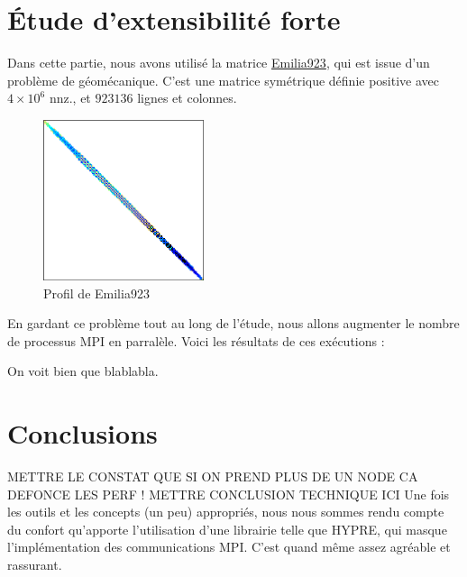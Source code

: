 \documentclass[10pt,twocolumn,letterpaper]{article}
\begin{document}
\section{Étude d'extensibilité forte}

Dans cette partie, nous avons utilisé la matrice
\href{https://sparse.tamu.edu/Janna/Emilia_923}{Emilia923}, qui est issue d'un
problème de géomécanique. C'est une matrice symétrique définie positive avec 
$4\times 10^6$ nnz., et $923136$ lignes et colonnes.

\begin{figure}[H]
  \centering
  \caption{Profil de Emilia923}
  \includegraphics[width=0.42\textwidth]{fig/Emilia923.png}
\end{figure}

En gardant ce problème tout au long de l'étude, nous allons augmenter le nombre
de processus MPI en parralèle. Voici les résultats de ces exécutions :


On voit bien que blablabla.


\section*{Conclusions}

METTRE LE CONSTAT QUE SI ON PREND PLUS DE UN NODE CA DEFONCE LES PERF !
METTRE CONCLUSION TECHNIQUE ICI
Une fois les outils et les concepts (un peu) appropriés, nous nous sommes rendu
compte du confort qu'apporte l'utilisation d'une librairie telle que HYPRE,
qui masque l'implémentation des communications MPI. C'est quand même assez
agréable et rassurant.
\end{document}
